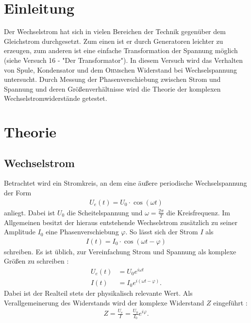 \documentclass[12pt,a4paper,titlepage,headinclude]{scrartcl}
\numberwithin{equation}{subsection}
\newcommand{\person}[1]{\textsc{#1}}
\begin{document}
\cleardoublepage
\tableofcontents
\thispagestyle{empty}
\cleardoublepage

\setcounter{footnote}{0}
\setcounter{page}{1}


\newpage

\section{Einleitung}
\label{sec:einleitung}
Der Wechselstrom hat sich in vielen Bereichen der Technik gegenüber dem Gleichstrom durchgesetzt. Zum einen ist er durch Generatoren leichter zu erzeugen, zum anderen ist eine einfache Transformation der Spannung möglich (siehe Versuch 16 - "Der Transformator"). In diesem Versuch wird das Verhalten von Spule, Kondensator und dem \person{Ohm}schen Widerstand bei Wechselspannung untersucht. Durch Messung der Phasenverschiebung zwischen Strom und Spannung und deren Größenverhältnisse wird die Theorie der komplexen Wechselstromwiderstände getestet.
\section{Theorie}
\subsection{Wechselstrom}
\label{sec:theorie}
Betrachtet wird ein Stromkreis, an dem eine äußere periodische Wechselspannung der Form
\begin{align}
	U_e(t)=U_0\cdot\cos(\omega t)
	\label{eq:wechselspannung}
\end{align}
anliegt. Dabei ist $U_0$ die Scheitelspannung und $\omega=\frac{2\pi}{T}$ die Kreisfrequenz. Im Allgemeinen besitzt der hieraus entstehende Wechselstrom zusätzlich zu seiner Amplitude $I_0$ eine Phasenverschiebung $\varphi$. So lässt sich der Strom $I$ als
\begin{align}
	I(t)=I_0\cdot\cos(\omega t-\varphi)
	\label{eq:wechselstrom}
\end{align}
schreiben. Es ist üblich, zur Vereinfachung Strom und Spannung als komplexe Größen zu schreiben \cite[253]{nol3}:
\begin{align}
	U_e(t)&=U_0e^{i\omega t}
	\label{eq:complexspannung}\\
	I(t)&=I_0e^{i(\omega t-\varphi)}.
	\label{eq:complexstrom}
\end{align}
Dabei ist der Realteil stets der physikalisch relevante Wert.
Als Verallgemeinerung des Widerstands wird der komplexe Widerstand $Z$ eingeführt \cite[254]{nol3}:
\begin{align}
	Z=\frac{U_e}{I}=\frac{U_0}{I_0}e^{i\varphi}.
	\label{eq:z}
\end{align}
\end{document}
